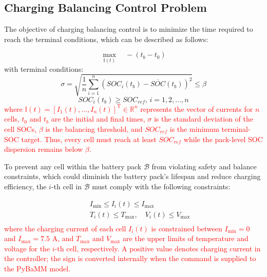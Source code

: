 \documentclass[journal]{IEEEtran}
\newcommand{\newrev}[1]{\textcolor{red}{#1}}
\begin{document}
\subsection{Charging Balancing Control Problem}
The objective of charging balancing control is to minimize the time required to reach the terminal conditions, which can be described as follows:

\begin{equation}\label{eqn:balancing objective}
    \displaystyle \max\limits_{\bm{\mathbb{I}}(t)} \quad - (t_b-t_0) 
\end{equation}
with terminal conditions:
\begin{equation}\label{terminal balance}
    \sigma = \sqrt{\frac{1}{n} \sum_{i=1}^{n} \left(SOC_i(t_b) - \overline{SOC}(t_b)\right)^2} \leq \beta
\end{equation}
\begin{equation}\label{terminal condition}
    SOC_i(t_b) \geq SOC_{ref}, \, i = 1,2,...,n
\end{equation}
\newrev{where $\bm{\mathbb{I}}(t) = \left[ I_1(t), \dots, I_n(t) \right]^{\mathrm{T}} \in \mathbb{R}^{n}$ represents the vector of currents for $n$ cells, $t_0$ and $t_b$ are the initial and final times, $\sigma$ is the standard deviation of the cell SOCs, $\beta$ is the balancing threshold, and $SOC_{ref}$ is the minimum terminal-SOC target. Thus, every cell must reach at least $SOC_{ref}$ while the pack-level SOC dispersion remains below $\beta$.}

To prevent any cell within the battery pack $\mathcal{B}$ from violating safety and balance constraints, which could diminish the battery pack's lifespan and reduce charging efficiency, the $i$-th cell in $\mathcal{B}$ must comply with the following constraints:

\begin{equation}\label{safty condition}
    \begin{array}{rl}
    & \quad I_{\min} \leq I_i(t) \leq I_{\max} \\[10pt]
    & \quad T_i(t) \leq T_{\max}, \quad V_i(t) \leq V_{\max} \\[10pt]
    \end{array}
\end{equation}
\newrev{where the charging current of each cell $I_i(t)$ is constrained between $I_{\min}=0$ and $I_{\max}=7.5$ A, and $T_{\max}$ and $V_{\max}$ are the upper limits of temperature and voltage for the $i$-th cell, respectively. A positive value denotes charging current in the controller; the sign is converted internally when the command is supplied to the PyBaMM model.}
\end{document}
